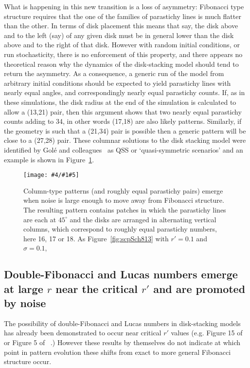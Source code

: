 \documentclass[a4paper,10pt]{amsart}
\newlength{\jfigwidth}
\newcommand{\pdffig}[3]{\jdofig{#1}{#2}{#3}{Figures}{.pdf}}
\newcommand{\jdofig}[5]{
	\begin{figure}\centering\texttt{[image: \#4/\#1\#5]} \caption{#2}\label{fig:#1}\end{figure}
}
\begin{document}
What is happening in this new transition is a loss of asymmetry:  Fibonacci type structure requires that the one of the families of parastichy lines is much flatter than the other. In terms of disk placement this means that say, the disk above and to the left (say) of any given disk must be in general lower than the disk above and to the right of that disk. However with random initial conditions, or run stochasticity, there is no enforcement of this property, and there appears no theoretical reason why the dynamics of the disk-stacking model should tend to return the asymmetry. As a consequence, a generic run of the model from arbitrary initial conditions should be expected to yield parastichy lines with nearly equal angles, and correspondingly nearly equal parastichy counts. If, as in these simulations, the disk radius at the end of the simulation is calculated to allow a (13,21) pair, then this argument shows that two nearly equal parastichy counts adding to 34, in other words (17,18) are also likely patterns. Similarly, if the geometry is such that a (21,34) pair is possible then a generic pattern will be close to a (27,28) pair. These columnar solutions to the disk stacking model were identified by Gol\'e and colleagues~\cite{goleFibonacciQuasisymmetricPhyllotaxis2016} as QSS or `quasi-symmetric scenarios'  and an example is shown in Figure~\ref{fig:scpColumn}.
\pdffig{scpColumn}{Column-type patterns (and roughly equal parastichy pairs) emerge when noise is large enough to move away from Fibonacci structure. The resulting pattern contains patches in which the parastichy lines are each at $45^\circ$ and the disks are arranged in alternating vertical columns, which correspond to roughly equal parastichy numbers, here 16, 17 or 18. As Figure~\ref{fig:scpSch813} with $r'=0.1$ and $\sigma=0.1$, }{1}

\subsection{Double-Fibonacci and Lucas numbers emerge at large $r$ near the critical $r'$ and are promoted by noise}
The possibility of double-Fibonacci and Lucas numbers in disk-stacking models has already been demonstrated to occur near critical $r'$ values (e.g. Figure 15 of~\cite{goleFibonacciQuasisymmetricPhyllotaxis2016} or Figure 5 of ~\cite{yonekuraMathematicalModelStudies2019}.) However these results by themselves do not indicate at which point in pattern evolution these shifts from exact to more general Fibonacci structure occur. 
\end{document}
